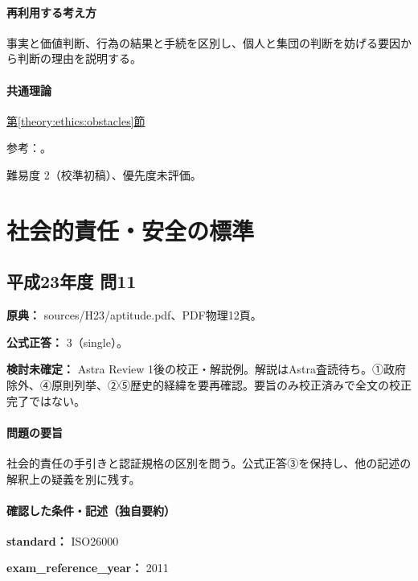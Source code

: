 \paragraph{再利用する考え方} 事実と価値判断、行為の結果と手続を区別し、個人と集団の判断を妨げる要因から判断の理由を説明する。

\paragraph{共通理論} \hyperref[theory:ethics:obstacles]{第\ref*{theory:ethics:obstacles}節}

\par 参考：\cite{davis_seven_steps}。

\par 難易度 2（校準初稿）、優先度未評価。

\section{社会的責任・安全の標準}

\subsection{平成23年度 問11}
\label{q:h23-reg-apt-11}

\noindent\textbf{原典：} sources/H23/aptitude.pdf、PDF物理12頁。

\textbf{公式正答：} 3（single）。

\par\textbf{検討未確定：} Astra Review 1後の校正・解説例。解説はAstra査読待ち。①政府除外、④原則列挙、②⑤歴史的経緯を要再確認。要旨のみ校正済みで全文の校正完了ではない。

\paragraph{問題の要旨} 社会的責任の手引きと認証規格の区別を問う。公式正答③を保持し、他の記述の解釈上の疑義を別に残す。

\paragraph{確認した条件・記述（独自要約）}\mbox{}\par

\noindent\textbf{standard：} ISO26000\par

\noindent\textbf{exam\_reference\_year：} 2011\par

